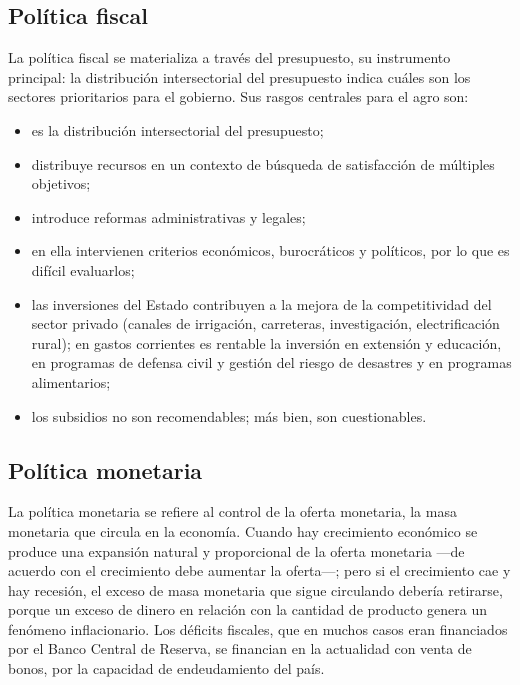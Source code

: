 \documentclass[
  man,
  floatsintext,
  longtable,
  a4paper,
  nolmodern,
  notxfonts,
  notimes,
  12pt,
  colorlinks=true,linkcolor=blue,citecolor=blue,urlcolor=blue]{apa7}
\providecommand{\tightlist}{%
  \setlength{\itemsep}{0pt}\setlength{\parskip}{0pt}}
\begin{document}
\subsection{Política fiscal}\label{poluxedtica-fiscal}

La política fiscal se materializa a través del presupuesto, su
instrumento principal: la distribución intersectorial del presupuesto
indica cuáles son los sectores prioritarios para el gobierno. Sus rasgos
centrales para el agro son:

\begin{itemize}
\tightlist
\item
  es la distribución intersectorial del presupuesto;
\item
  distribuye recursos en un contexto de búsqueda de satisfacción de
  múltiples objetivos;
\item
  introduce reformas administrativas y legales;
\item
  en ella intervienen criterios económicos, burocráticos y políticos,
  por lo que es difícil evaluarlos;
\item
  las inversiones del Estado contribuyen a la mejora de la
  competitividad del sector privado (canales de irrigación, carreteras,
  investigación, electrificación rural); en gastos corrientes es
  rentable la inversión en extensión y educación, en programas de
  defensa civil y gestión del riesgo de desastres y en programas
  alimentarios;
\item
  los subsidios no son recomendables; más bien, son cuestionables.
\end{itemize}

\subsection{Política monetaria}\label{poluxedtica-monetaria}

La política monetaria se refiere al control de la oferta monetaria, la
masa monetaria que circula en la economía. Cuando hay crecimiento
económico se produce una expansión natural y proporcional de la oferta
monetaria ---de acuerdo con el crecimiento debe aumentar la oferta---;
pero si el crecimiento cae y hay recesión, el exceso de masa monetaria
que sigue circulando debería retirarse, porque un exceso de dinero en
relación con la cantidad de producto genera un fenómeno inflacionario.
Los déficits fiscales, que en muchos casos eran financiados por el Banco
Central de Reserva, se financian en la actualidad con venta de bonos,
por la capacidad de endeudamiento del país.
\end{document}
